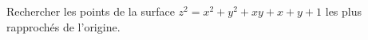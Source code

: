 \begin{exercice}\label{exoFoncDeuxVar0008}

Rechercher les points de la surface $z^2=x^2+y^2+xy+x+y+1$ les plus rapprochés de l'origine.

\end{exercice}
